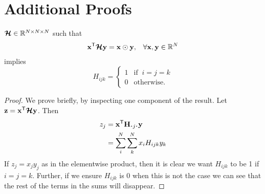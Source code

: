 \chapter{Additional Proofs}
\begin{prop}  \label{prop:identity}
	\(\bm{\mathcal{H}} \in \mathbb{R}^{N \times N \times N}\) such that
\begin{align}
\mathbf{x}^\mathsf{T}\bm{\mathcal{H}}\mathbf{y} = \mathbf{x} \odot \mathbf{y}, 
&&\forall \mathbf{x},\mathbf{y} \in \mathbb{R}^{N}
\end{align} implies
\begin{equation}
	H_{ijk} = \begin{cases}
		1 & \text{if}\;\;i = j = k \\
		0 & \text{otherwise.}
	\end{cases}
\end{equation}

\end{prop}
\begin{proof}
We prove briefly, by inspecting one component of the result. Let 
\(\mathbf{z} = \mathbf{x}^\mathsf{T}\bm{\mathcal{H}}\mathbf{y}\). Then
\begin{align}
	z_j &= \vec{x}^\mathsf{T}\mat{H}_{\midbullet j \midbullet}\vec{y} \\
		&= \sum_i^N\sum_k^N x_iH_{ijk}y_k
\end{align}
If \(z_j = x_jy_j\) as in the elementwise product, then it is clear we want \(H_{ijk}\) to be 
1 if \(i=j=k\). Further, if we ensure \(H_{ijk}\) is 0 when this is not the case we can see that
the rest of the terms in the sums will disappear.
\end{proof}